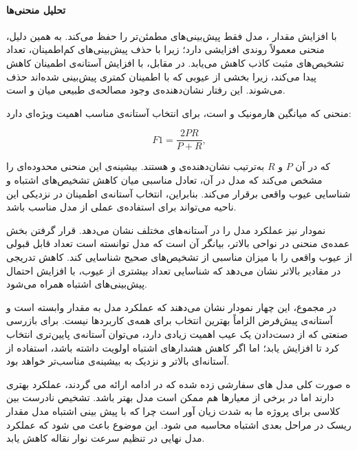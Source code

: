 \documentclass[a4paper, 10pt, twocolumn]{article}
\begin{document}
	\paragraph{تحلیل منحنی‌ها}
	با افزایش مقدار ، مدل فقط پیش‌بینی‌های مطمئن‌تر را حفظ می‌کند. به همین دلیل، منحنی  معمولاً روندی افزایشی دارد؛ زیرا با حذف پیش‌بینی‌های کم‌اطمینان، تعداد تشخیص‌های مثبت کاذب کاهش می‌یابد. در مقابل،  با افزایش آستانه‌ی اطمینان کاهش پیدا می‌کند، زیرا بخشی از عیوبی که با اطمینان کمتری پیش‌بینی شده‌اند حذف می‌شوند. این رفتار نشان‌دهنده‌ی وجود مصالحه‌ی طبیعی میان  و  است.
	
	منحنی  که میانگین هارمونیک  و  است، برای انتخاب آستانه‌ی مناسب اهمیت ویژه‌ای دارد:
	
	\begin{latin}
		\begin{equation}
			F1 = \frac{2PR}{P+R},
		\end{equation}
	\end{latin}
	
	که در آن $P$ و $R$ به‌ترتیب نشان‌دهنده‌ی  و  هستند. بیشینه‌ی این منحنی محدوده‌ای را مشخص می‌کند که مدل در آن، تعادل مناسبی میان کاهش تشخیص‌های اشتباه و شناسایی عیوب واقعی برقرار می‌کند. بنابراین، انتخاب آستانه‌ی اطمینان در نزدیکی این ناحیه می‌تواند برای استفاده‌ی عملی از مدل مناسب باشد.
	
	نمودار  نیز عملکرد مدل را در آستانه‌های مختلف نشان می‌دهد. قرار گرفتن بخش عمده‌ی منحنی در نواحی بالاتر، بیانگر آن است که مدل توانسته است تعداد قابل قبولی از عیوب واقعی را با میزان مناسبی از تشخیص‌های صحیح شناسایی کند. کاهش تدریجی  در مقادیر بالاتر  نشان می‌دهد که شناسایی تعداد بیشتری از عیوب، با افزایش احتمال پیش‌بینی‌های اشتباه همراه می‌شود.
	
	در مجموع، این چهار نمودار نشان می‌دهند که عملکرد مدل به مقدار  وابسته است و آستانه‌ی پیش‌فرض الزاماً بهترین انتخاب برای همه‌ی کاربردها نیست. برای بازرسی صنعتی که از دست‌دادن یک عیب اهمیت زیادی دارد، می‌توان آستانه‌ی پایین‌تری انتخاب کرد تا  افزایش یابد؛ اما اگر کاهش هشدارهای اشتباه اولویت داشته باشد، استفاده از آستانه‌ای بالاتر و نزدیک به بیشینه‌ی  مناسب‌تر خواهد بود.
	
	
	ه صورت کلی مدل های سفارشی زده شده که در ادامه ارائه می گردند، عملکرد بهتری دارند اما در برخی از معیارها هم ممکن است مدل  بهتر باشد. تشخیص نادرست بین کلاسی برای پروژه ما به شدت زیان آور است چرا که با پیش بینی اشتباه مدل  مقدار ریسک در مراحل بعدی اشتباه محاسبه می شود. این موضوع باعث می شود که عملکرد مدل نهایی در تنظیم سرعت نوار نقاله کاهش یابد.
	
\end{document}
